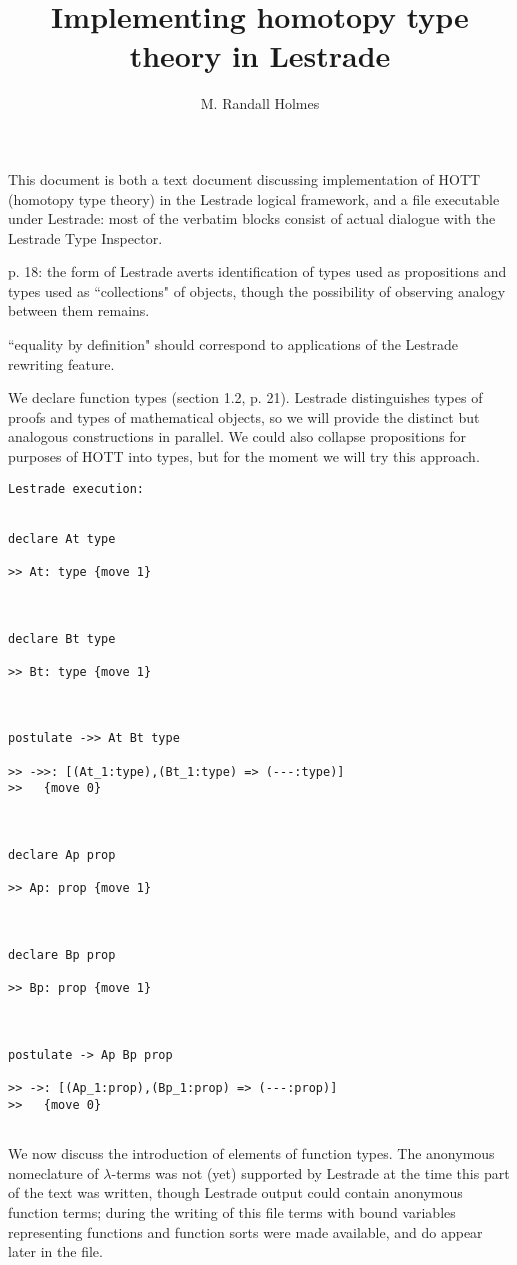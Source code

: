 \documentclass{article}
\title{Implementing homotopy type theory in Lestrade}
\author{M. Randall Holmes}
\begin{document}
\maketitle

This document is both a text document discussing implementation of HOTT (homotopy type theory) in the Lestrade logical framework, and a file executable under Lestrade:  most of the verbatim blocks consist of actual dialogue with the Lestrade Type Inspector.

p. 18:  the form of Lestrade averts identification of types used as propositions and types used as ``collections" of objects, though the possibility of observing analogy between them remains.

``equality by definition"  should correspond to applications of the Lestrade rewriting feature.

We declare function types (section 1.2, p. 21).  Lestrade distinguishes types of proofs and types of mathematical objects, so we will provide the distinct but analogous
constructions in parallel.  We could also collapse propositions for purposes of HOTT into types, but for the moment we will try this approach.

\begin{verbatim}Lestrade execution:


declare At type

>> At: type {move 1}



declare Bt type

>> Bt: type {move 1}



postulate ->> At Bt type

>> ->>: [(At_1:type),(Bt_1:type) => (---:type)]
>>   {move 0}



declare Ap prop

>> Ap: prop {move 1}



declare Bp prop

>> Bp: prop {move 1}



postulate -> Ap Bp prop

>> ->: [(Ap_1:prop),(Bp_1:prop) => (---:prop)]
>>   {move 0}


\end{verbatim}

We now discuss the introduction of elements of function types.  The anonymous nomeclature of $\lambda$-terms was not (yet) supported by Lestrade at the time this part of the text was written, though Lestrade output could contain anonymous function terms;  during the writing of this file terms with bound variables representing functions and function sorts were made available, and do appear later in the file.
\end{document}
